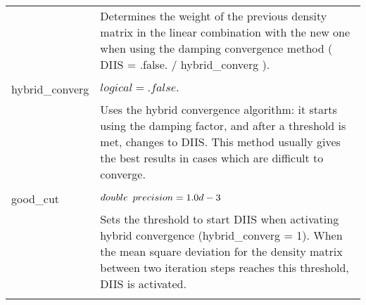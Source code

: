\begin{Spacing}{1.0}
\begin{longtable}{ p{} p{} }
         & Determines the weight of the previous density matrix in the linear 
         combination with the new one when using the damping convergence method
         ( DIIS = .false. / hybrid\_converg ).\\
         \\
         hybrid\_converg & $ logical = .false. $\\
         & Uses the hybrid convergence algorithm: it starts using the damping
         factor, and after a threshold is met, changes to DIIS. This method
         usually gives the best results in cases which are difficult to 
         converge.\\
         \\
         good\_cut & $ double \hspace{0.5em} precision = 1.0d-3 $\\
         & Sets the threshold to start DIIS when activating hybrid convergence
         (hybrid\_converg = 1). When the mean square deviation for the density
         matrix between two iteration steps reaches this threshold, DIIS is
         activated. \\
         \\
   \end{longtable}
\end{Spacing}

